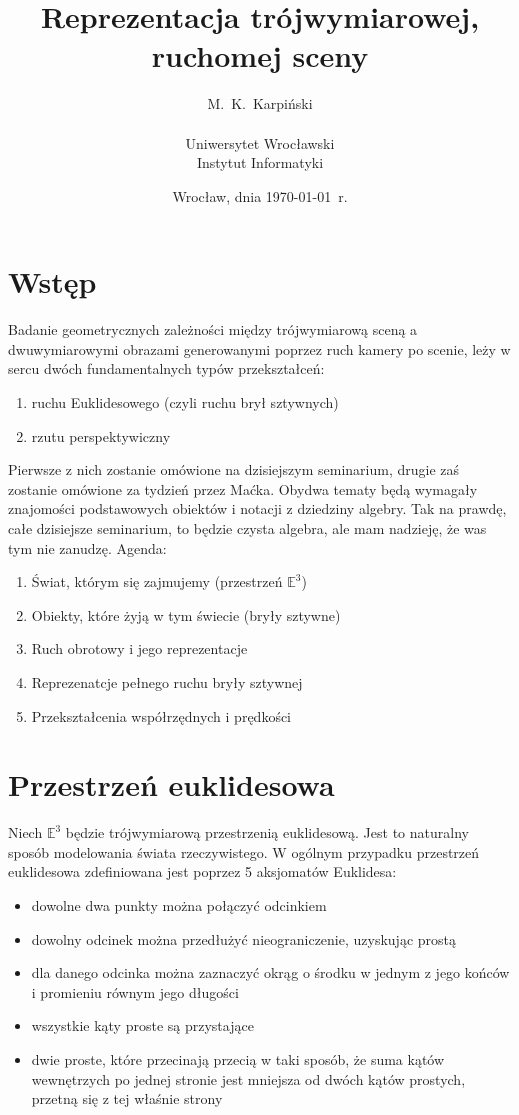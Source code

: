 \documentclass[a4paper,12pt]{article}
\title{Reprezentacja trójwymiarowej, ruchomej sceny}
\author{M.~K.~Karpiński\\
\\
Uniwersytet Wrocławski\\
Instytut Informatyki}
\date{Wrocław, dnia \today\ r.}
\newcommand{\E}{\mathbb{E}}
\begin{document}
\maketitle

\section{Wstęp}
\indent \indent Badanie geometrycznych zależności między trójwymiarową sceną a dwuwymiarowymi obrazami generowanymi poprzez ruch kamery po scenie, leży w sercu dwóch fundamentalnych typów przekształceń:

\begin{enumerate}
  \item ruchu Euklidesowego (czyli ruchu brył sztywnych)
  \item rzutu perspektywiczny
\end{enumerate}

Pierwsze z nich zostanie omówione na dzisiejszym seminarium, drugie zaś zostanie omówione za tydzień przez Maćka. Obydwa tematy będą wymagały znajomości podstawowych obiektów i notacji z dziedziny algebry. Tak na prawdę, całe dzisiejsze seminarium, to będzie czysta algebra, ale mam nadzieję, że was tym nie zanudzę. Agenda:

\begin{enumerate}
\item Świat, którym się zajmujemy (przestrzeń $\E^3$)
\item Obiekty, które żyją w tym świecie (bryły sztywne)
\item Ruch obrotowy i jego reprezentacje
\item Reprezenatcje pełnego ruchu bryły sztywnej 
\item Przekształcenia współrzędnych i prędkości
\end{enumerate}

\section{Przestrzeń euklidesowa}
\indent \indent Niech $\E^3$ będzie trójwymiarową przestrzenią euklidesową. Jest to naturalny sposób modelowania świata rzeczywistego. W ogólnym przypadku przestrzeń euklidesowa zdefiniowana jest poprzez 5 aksjomatów Euklidesa:

\begin{itemize}
\item dowolne dwa punkty można połączyć odcinkiem
\item dowolny odcinek można przedłużyć nieograniczenie, uzyskując prostą
\item dla danego odcinka można zaznaczyć okrąg o środku w jednym z jego końców i promieniu równym jego długości
\item wszystkie kąty proste są przystające
\item dwie proste, które przecinają przecią w taki sposób, że suma kątów wewnętrzych po jednej stronie jest mniejsza od dwóch kątów prostych, przetną się z tej właśnie strony
\end{itemize}
\end{document}
